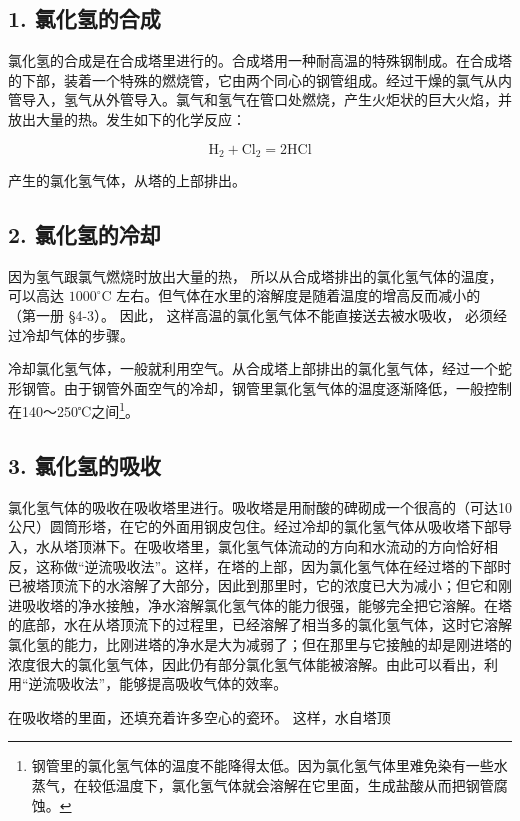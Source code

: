 \subsection{1. 氯化氢的合成}

氯化氢的合成是在合成塔里进行的。合成塔用一种耐高温的特殊钢制成。在合成塔的下部，装着一个特殊的燃烧管，它由两个同心的钢管组成。经过干燥的氯气从内管导入，氢气从外管导入。氯气和氢气在管口处燃烧，产生火炬状的巨大火焰，并放出大量的热。发生如下的化学反应：

\[
\mathrm{H} _ {2} + \mathrm{Cl} _ {2} = 2 \mathrm{HCl}
\]

产生的氯化氢气体，从塔的上部排出。

\subsection{2. 氯化氢的冷却}

因为氢气跟氯气燃烧时放出大量的热， 所以从合成塔排出的氯化氢气体的温度，
可以高达 \(1000^{\circ} \mathrm{C}\)
左右。但气体在水里的溶解度是随着温度的增高反而减小的 （第一册 §4-3）。
因此， 这样高温的氯化氢气体不能直接送去被水吸收，
必须经过冷却气体的步骤。

冷却氯化氢气体，一般就利用空气。从合成塔上部排出的氯化氢气体，经过一个蛇形钢管。由于钢管外面空气的冷却，钢管里氯化氢气体的温度逐渐降低，一般控制在140～250℃之间\footnote{钢管里的氯化氢气体的温度不能降得太低。因为氯化氢气体里难免染有一些水蒸气，在较低温度下，氯化氢气体就会溶解在它里面，生成盐酸从而把钢管腐蚀。}。

\subsection{3. 氯化氢的吸收}

氯化氢气体的吸收在吸收塔里进行。吸收塔是用耐酸的碑砌成一个很高的（可达10公尺）圆筒形塔，在它的外面用钢皮包住。经过冷却的氯化氢气体从吸收塔下部导入，水从塔顶淋下。在吸收塔里，氯化氢气体流动的方向和水流动的方向恰好相反，这称做``逆流吸收法''。这样，在塔的上部，因为氯化氢气体在经过塔的下部时已被塔顶流下的水溶解了大部分，因此到那里时，它的浓度已大为减小；但它和刚进吸收塔的净水接触，净水溶解氯化氢气体的能力很强，能够完全把它溶解。在塔的底部，水在从塔顶流下的过程里，已经溶解了相当多的氯化氢气体，这时它溶解氯化氢的能力，比刚进塔的净水是大为减弱了；但在那里与它接触的却是刚进塔的浓度很大的氯化氢气体，因此仍有部分氯化氢气体能被溶解。由此可以看出，利用``逆流吸收法''，能够提高吸收气体的效率。

在吸收塔的里面，还填充着许多空心的瓷环。 这样，水自塔顶

